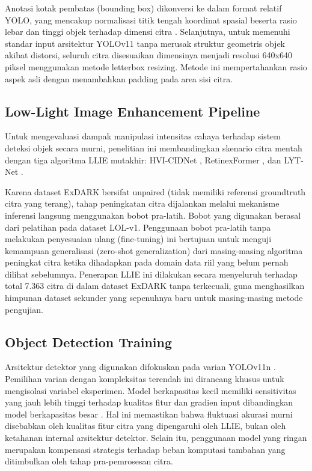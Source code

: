 \documentclass[conference]{IEEEtran}
\begin{document}
Anotasi kotak pembatas (bounding box) dikonversi ke dalam format relatif YOLO, yang mencakup normalisasi titik tengah koordinat spasial beserta rasio lebar dan tinggi objek terhadap dimensi citra \cite{padilla2021metrics}. Selanjutnya, untuk memenuhi standar input arsitektur YOLOv11 tanpa merusak struktur geometris objek akibat distorsi, seluruh citra disesuaikan dimensinya menjadi resolusi 640x640 piksel menggunakan metode letterbox resizing. Metode ini mempertahankan rasio aspek asli dengan menambahkan padding pada area sisi citra.

\subsection{Low-Light Image Enhancement Pipeline}
Untuk mengevaluasi dampak manipulasi intensitas cahaya terhadap sistem deteksi objek secara murni, penelitian ini membandingkan skenario citra mentah dengan tiga algoritma LLIE mutakhir: HVI-CIDNet \cite{yan2025hvi}, RetinexFormer \cite{cai2023retinexformer}, dan LYT-Net \cite{brateanu2025lytnet}. 

Karena dataset ExDARK bersifat unpaired (tidak memiliki referensi groundtruth citra yang terang), tahap peningkatan citra dijalankan melalui mekanisme inferensi langsung menggunakan bobot pra-latih. Bobot yang digunakan berasal dari pelatihan pada dataset LOL-v1. Penggunaan bobot pra-latih tanpa melakukan penyesuaian ulang (fine-tuning) ini bertujuan untuk menguji kemampuan generalisasi (zero-shot generalization) dari masing-masing algoritma peningkat citra ketika dihadapkan pada domain data riil yang belum pernah dilihat sebelumnya. Penerapan LLIE ini dilakukan secara menyeluruh terhadap total 7.363 citra di dalam dataset ExDARK tanpa terkecuali, guna menghasilkan himpunan dataset sekunder yang sepenuhnya baru untuk masing-masing metode pengujian.

\subsection{Object Detection Training}
Arsitektur detektor yang digunakan difokuskan pada varian YOLOv11n \cite{khanam2024yolov11}. Pemilihan varian dengan kompleksitas terendah ini dirancang khusus untuk mengisolasi variabel eksperimen. Model berkapasitas kecil memiliki sensitivitas yang jauh lebih tinggi terhadap kualitas fitur dan gradien input dibandingkan model berkapasitas besar \cite{dobrzycki2025freezing}. Hal ini memastikan bahwa fluktuasi akurasi murni disebabkan oleh kualitas fitur citra yang dipengaruhi oleh LLIE, bukan oleh ketahanan internal arsitektur detektor. Selain itu, penggunaan model yang ringan merupakan kompensasi strategis terhadap beban komputasi tambahan yang ditimbulkan oleh tahap pra-pemrosesan citra.
\end{document}
